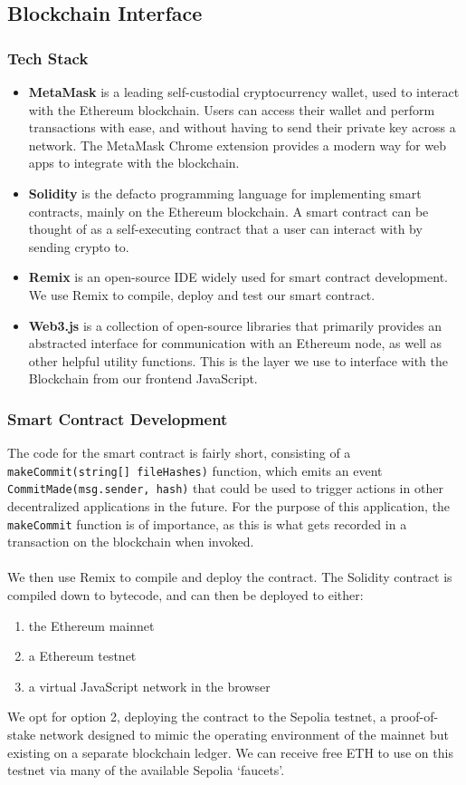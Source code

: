 \documentclass[12pt,a4paper]{article}
\begin{document}
\subsection{Blockchain Interface}
\subsubsection{Tech Stack}
\begin{itemize}
    \item \textbf{MetaMask} is a leading self-custodial cryptocurrency wallet, used to interact with the Ethereum blockchain. Users can access their wallet and perform transactions with ease, and without having to send their private key across a network. The MetaMask Chrome extension provides a modern way for web apps to integrate with the blockchain.
    \item \textbf{Solidity} is the defacto programming language for implementing smart contracts, mainly on the Ethereum blockchain. A smart contract can be thought of as a self-executing contract that a user can interact with by sending crypto to.
    \item \textbf{Remix} is an open-source IDE widely used for smart contract development. We use Remix to compile, deploy and test our smart contract. 
    \item \textbf{Web3.js} is a collection of open-source libraries that primarily provides an abstracted interface for communication with an Ethereum node, as well as other helpful utility functions. This is the layer we use to interface with the Blockchain from our frontend JavaScript.
\end{itemize}
\subsubsection{Smart Contract Development}
The code for the smart contract is fairly short, consisting of a 
\\\verb|makeCommit(string[] fileHashes)| function, which emits an event\\ \verb|CommitMade(msg.sender, hash)| that could be used to trigger actions in other decentralized applications in the future. For the purpose of this application, the \verb|makeCommit| function is of importance, as this is what gets recorded in a transaction on the blockchain when invoked.\\\\
We then use Remix to compile and deploy the contract. The Solidity contract is compiled down to bytecode, and can then be deployed to either:
\begin{enumerate}
    \item the Ethereum mainnet
    \item a Ethereum testnet
    \item a virtual JavaScript network in the browser
\end{enumerate}
We opt for option 2,  deploying the contract to the Sepolia testnet, a proof-of-stake network designed to mimic the operating environment of the mainnet but existing on a separate blockchain ledger. We can receive free ETH to use on this testnet via many of the available Sepolia `faucets'.
\end{document}
